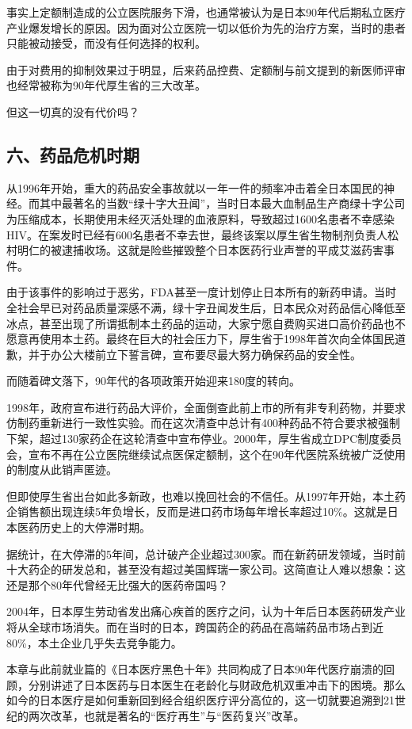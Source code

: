 事实上定额制造成的公立医院服务下滑，也通常被认为是日本90年代后期私立医疗产业爆发增长的原因。因为面对公立医院一切以低价为先的治疗方案，当时的患者只能被动接受，而没有任何选择的权利。

由于对费用的抑制效果过于明显，后来药品控费、定额制与前文提到的新医师评审也经常被称为90年代厚生省的三大改革。

但这一切真的没有代价吗？

\subsection{六、药品危机时期}

从1996年开始，重大的药品安全事故就以一年一件的频率冲击着全日本国民的神经。而其中最著名的当数“绿十字大丑闻”，当时日本最大血制品生产商绿十字公司为压缩成本，长期使用未经灭活处理的血液原料，导致超过1600名患者不幸感染HIV。在案发时已经有600名患者不幸去世，最终该案以厚生省生物制剂负责人松村明仁的被逮捕收场。这就是险些摧毁整个日本医药行业声誉的平成艾滋药害事件。

由于该事件的影响过于恶劣，FDA甚至一度计划停止日本所有的新药申请。当时全社会早已对药品质量深感不满，绿十字丑闻发生后，日本民众对药品信心降低至冰点，甚至出现了所谓抵制本土药品的运动，大家宁愿自费购买进口高价药品也不愿意再使用本土药。最终在巨大的社会压力下，厚生省于1998年首次向全体国民道歉，并于办公大楼前立下誓言碑，宣布要尽最大努力确保药品的安全性。

而随着碑文落下，90年代的各项政策开始迎来180度的转向。

1998年，政府宣布进行药品大评价，全面倒查此前上市的所有非专利药物，并要求仿制药重新进行一致性实验。而在这次清查中总计有400种药品不符合要求被强制下架，超过130家药企在这轮清查中宣布停业。2000年，厚生省成立DPC制度委员会，宣布不再在公立医院继续试点医保定额制，这个在90年代医院系统被广泛使用的制度从此销声匿迹。

但即使厚生省出台如此多新政，也难以挽回社会的不信任。从1997年开始，本土药企销售额出现连续5年负增长，反而是进口药市场每年增长率超过10\%。这就是日本医药历史上的大停滞时期。

据统计，在大停滞的5年间，总计破产企业超过300家。而在新药研发领域，当时前十大药企的研发总和，甚至没有超过美国辉瑞一家公司。这简直让人难以想象：这还是那个80年代曾经无比强大的医药帝国吗？

2004年，日本厚生劳动省发出痛心疾首的医疗之问，认为十年后日本医药研发产业将从全球市场消失。而在当时的日本，跨国药企的药品在高端药品市场占到近80\%，本土企业几乎失去竞争能力。

本章与此前就业篇的《日本医疗黑色十年》共同构成了日本90年代医疗崩溃的回顾，分别讲述了日本医药与日本医生在老龄化与财政危机双重冲击下的困境。那么如今的日本医疗是如何重新回到经合组织医疗评分高位的，这一切就要追溯到21世纪的两次改革，也就是著名的“医疗再生”与“医药复兴”改革。
